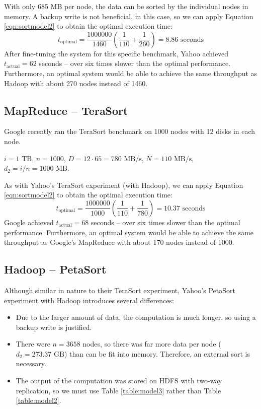 \documentclass{acm_proc_article-sp}
\begin{document}
With only 685 MB per node, the data can be sorted by the individual nodes in memory. A backup write is not beneficial, in this case, so we can apply Equation \ref{eqn:sortmodel2} to obtain the optimal execution time:
\[t_\text{optimal} = \frac{1000000}{1460} \left( \frac{1}{110} + \frac{1}{260}
\right) = 8.86 \text{ seconds}\]
After fine-tuning the system for this specific
benchmark, Yahoo achieved $t_\text{actual} = 62$ seconds -- over six times
slower than the optimal performance. Furthermore, an optimal system would be
able to achieve the same throughput as Hadoop with about 270 nodes
instead of 1460.

\subsection{MapReduce -- TeraSort}

Google recently ran \cite{sorting1pb} the TeraSort benchmark on 1000 nodes with 12 disks in each node.

$i = 1 \text{ TB}$, $n = 1000$, $D = 12 \cdot 65 = 780 \text{ MB/s}$, $N = 110 \text{ MB/s}$, $d_2 = i/n = 1000 \text{ MB}$.

As with Yahoo's TeraSort experiment (with Hadoop), we can apply Equation \ref{eqn:sortmodel2} to obtain the optimal execution time:
\[t_\text{optimal} = \frac{1000000}{1000} \left( \frac{1}{110} + \frac{1}{780}
\right) = 10.37 \text{ seconds}\]
Google achieved $t_\text{actual} = 68$
seconds -- over six times slower than the optimal performance. Furthermore, an
optimal system would be able to achieve the same throughput as Google's
MapReduce with about 170 nodes instead of 1000.

\subsection{Hadoop -- PetaSort}
Although similar in nature to their TeraSort experiment, Yahoo's PetaSort experiment with Hadoop introduces several differences:
\begin{itemize}
  \item Due to the larger amount of data, the computation is much longer, so
  using a backup write is justified.
  \item There were $n = 3658$ nodes, so there was far more data per node ($d_2 = 273.37 \text{ GB}$) than can be fit into memory. Therefore, an external sort is necessary.
  \item The output of the computation was stored on HDFS with two-way replication, so we must use Table \ref{table:model3} rather than Table \ref{table:model2}.
\end{itemize}
\end{document}

